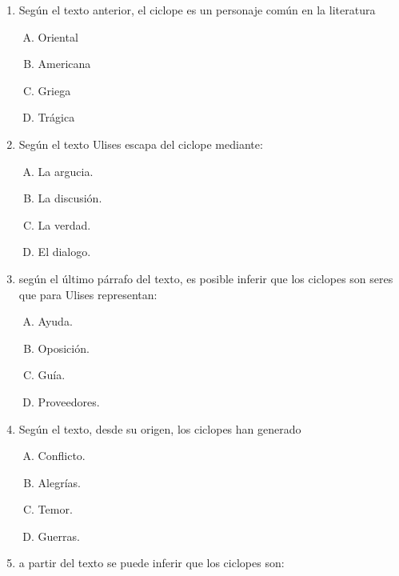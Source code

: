 \begin{enumerate}

\item Según el texto anterior, el ciclope es un personaje común en la literatura \label{lit-1}


\begin{enumerate}[(A)]
\item Oriental
\item Americana
\item Griega
\item Trágica 
\end{enumerate}



\item Según el texto Ulises escapa del ciclope mediante:\label{lit-2}

\begin{enumerate}[(A)]
\item La argucia.
\item La discusión. 
\item La verdad. 
\item El dialogo.
\end{enumerate}


\item según el último párrafo del texto, es posible inferir que los ciclopes son seres que para Ulises representan: \label{lit-3}
\begin{enumerate}[(A)]
\item Ayuda. 
\item Oposición.
\item Guía. 
\item Proveedores.
\end{enumerate}

\item Según el texto, desde su origen, los ciclopes han generado\label{lit-4}
\begin{enumerate}[(A)]
\item Conflicto.
\item Alegrías.
\item Temor.
\item Guerras.
\end{enumerate}


\item a partir del texto se puede inferir que los ciclopes  son:\label{lit-5}


\end{enumerate}
